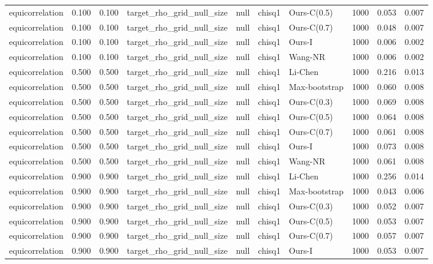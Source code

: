 \begin{tabular}{lrrllllrrr}
equicorrelation & 0.100 & 0.100 & target\_rho\_grid\_null\_size & null & chisq1 & Ours-C(0.5) & 1000 & 0.053 & 0.007 \\
equicorrelation & 0.100 & 0.100 & target\_rho\_grid\_null\_size & null & chisq1 & Ours-C(0.7) & 1000 & 0.048 & 0.007 \\
equicorrelation & 0.100 & 0.100 & target\_rho\_grid\_null\_size & null & chisq1 & Ours-I & 1000 & 0.006 & 0.002 \\
equicorrelation & 0.100 & 0.100 & target\_rho\_grid\_null\_size & null & chisq1 & Wang-NR & 1000 & 0.006 & 0.002 \\
equicorrelation & 0.500 & 0.500 & target\_rho\_grid\_null\_size & null & chisq1 & Li-Chen & 1000 & 0.216 & 0.013 \\
equicorrelation & 0.500 & 0.500 & target\_rho\_grid\_null\_size & null & chisq1 & Max-bootstrap & 1000 & 0.060 & 0.008 \\
equicorrelation & 0.500 & 0.500 & target\_rho\_grid\_null\_size & null & chisq1 & Ours-C(0.3) & 1000 & 0.069 & 0.008 \\
equicorrelation & 0.500 & 0.500 & target\_rho\_grid\_null\_size & null & chisq1 & Ours-C(0.5) & 1000 & 0.064 & 0.008 \\
equicorrelation & 0.500 & 0.500 & target\_rho\_grid\_null\_size & null & chisq1 & Ours-C(0.7) & 1000 & 0.061 & 0.008 \\
equicorrelation & 0.500 & 0.500 & target\_rho\_grid\_null\_size & null & chisq1 & Ours-I & 1000 & 0.073 & 0.008 \\
equicorrelation & 0.500 & 0.500 & target\_rho\_grid\_null\_size & null & chisq1 & Wang-NR & 1000 & 0.061 & 0.008 \\
equicorrelation & 0.900 & 0.900 & target\_rho\_grid\_null\_size & null & chisq1 & Li-Chen & 1000 & 0.256 & 0.014 \\
equicorrelation & 0.900 & 0.900 & target\_rho\_grid\_null\_size & null & chisq1 & Max-bootstrap & 1000 & 0.043 & 0.006 \\
equicorrelation & 0.900 & 0.900 & target\_rho\_grid\_null\_size & null & chisq1 & Ours-C(0.3) & 1000 & 0.052 & 0.007 \\
equicorrelation & 0.900 & 0.900 & target\_rho\_grid\_null\_size & null & chisq1 & Ours-C(0.5) & 1000 & 0.053 & 0.007 \\
equicorrelation & 0.900 & 0.900 & target\_rho\_grid\_null\_size & null & chisq1 & Ours-C(0.7) & 1000 & 0.057 & 0.007 \\
equicorrelation & 0.900 & 0.900 & target\_rho\_grid\_null\_size & null & chisq1 & Ours-I & 1000 & 0.053 & 0.007 \\

\end{tabular}
